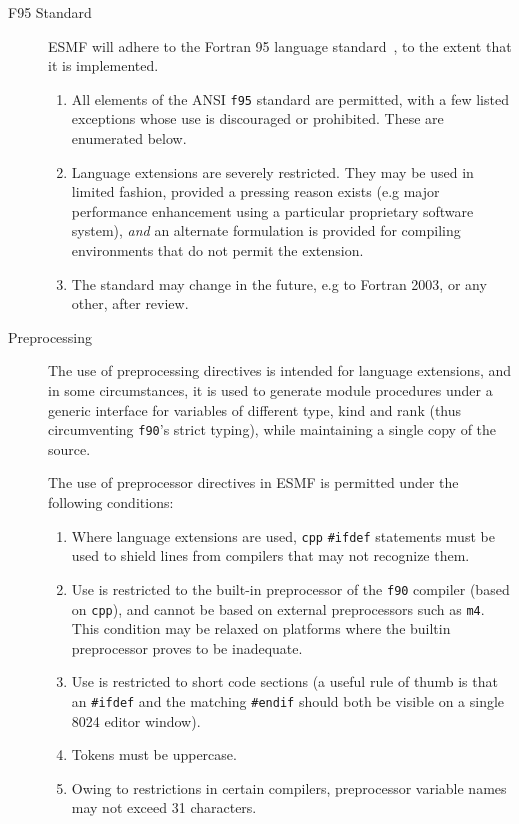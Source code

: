 \begin{description}

\item[F95 Standard] ESMF will adhere to the Fortran 95 language
  standard~\cite{ref:f95}, to the extent that it is implemented.

\begin{enumerate}
\item All elements of the ANSI \texttt{f95} standard are permitted,
  with a few listed exceptions whose use is discouraged or prohibited.
  These are enumerated below.
\item Language extensions are severely restricted. They may be used in
  limited fashion, provided a pressing reason exists (e.g major
  performance enhancement using a particular proprietary software
  system), \emph{and} an alternate formulation is provided for compiling
  environments that do not permit the extension.
\item The standard may change in the future, e.g to Fortran 2003, or
  any other, after review.
\end{enumerate}
  
\item[Preprocessing] The use of preprocessing directives is intended
  for language extensions, and in some circumstances, it is used to
  generate module procedures under a generic interface for variables
  of different type, kind and rank (thus circumventing \texttt{f90}'s
  strict typing), while maintaining a single copy of the source.

The use of preprocessor directives in ESMF is permitted under the
following conditions:

\begin{enumerate}
\item Where language extensions are used, \texttt{cpp}
  \texttt{\#ifdef} statements must be used to shield lines from
  compilers that may not recognize them.
\item Use is restricted to the built-in preprocessor of the
  \texttt{f90} compiler (based on \texttt{cpp}), and cannot be based
  on external preprocessors such as \texttt{m4}. This condition may be
  relaxed on platforms where the builtin preprocessor proves to be
  inadequate.
\item Use is restricted to short code sections (a useful rule of thumb
  is that an \texttt{\#ifdef} and the matching \texttt{\#endif} should
  both be visible on a single 8024 editor
  window).
\item Tokens must be uppercase.
\item Owing to restrictions in certain compilers, preprocessor
  variable names may not exceed 31 characters.
\end{enumerate}


\end{description}
